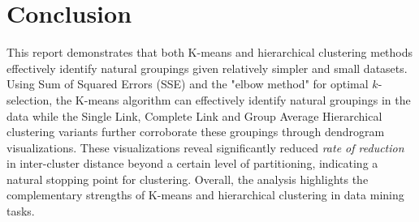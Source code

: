 \documentclass{article}
\begin{document}
\section{Conclusion}
This report demonstrates that both K-means and hierarchical clustering methods effectively identify natural groupings given relatively
simpler and small datasets. Using Sum of Squared Errors (SSE) and the "elbow method" for optimal \( k \)-selection, the K-means algorithm
can effectively identify natural groupings in the data while the Single Link, Complete Link and Group Average Hierarchical clustering
variants further corroborate these groupings through dendrogram visualizations. These visualizations reveal significantly reduced
\textit{rate of reduction} in inter-cluster distance beyond a certain level of partitioning, indicating a natural stopping point for
clustering. Overall, the analysis highlights the complementary strengths of K-means and hierarchical clustering in data mining tasks.
\end{document}
